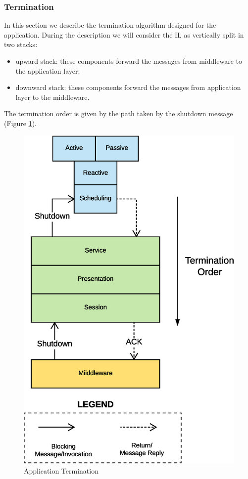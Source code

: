 \subsubsection{Termination}

In this section we describe the termination algorithm designed for the
application.
During the description we will consider the IL as
vertically split in two stacks:

\begin{itemize}
  \item upward stack: these components forward the messages
  from middleware to the application layer;
  \item downward stack: these components forward the messages
  from application layer to the middleware.
\end{itemize}

The termination order is
given by the path taken by the shutdown message
(Figure \ref{fig:termination-app}).

\begin{figure}[H]
  \centering
  \includegraphics[scale=0.4,keepaspectratio]
    {images/solution/termination-app.eps}
  \caption{Application Termination}
  \label{fig:termination-app}
\end{figure}


